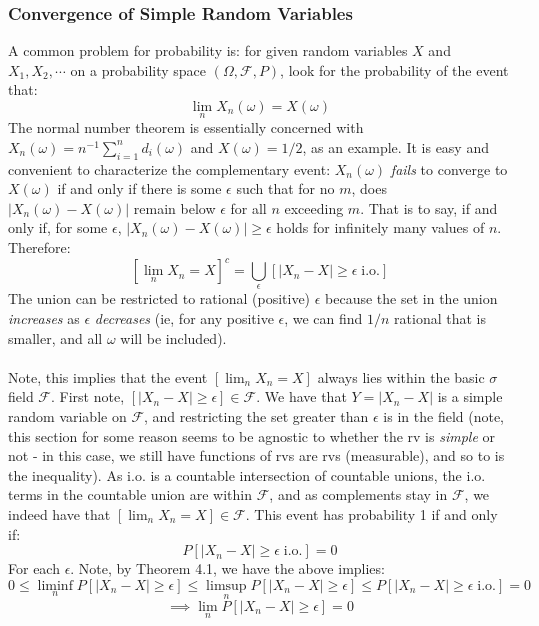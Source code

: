 \documentclass[12pt,a4paper]{article}
\newcommand{\1}[1]{\mathbbm{1}\left\{ #1 \right\}}
\newcommand{\fcal}{\mathcal{F}}
\newcommand{\io}{\text{i.o.}}
\begin{document}
\subsubsection{Convergence of Simple Random Variables}
A common problem for probability is: for given random variables $X$ and $X_1, X_2, \cdots$ on a probability space $(\Omega,\fcal,P)$, look for the probability of the event that:
$$
	\lim_n X_n(\omega) = X(\omega)
$$
The normal number theorem is essentially concerned with $X_n(\omega) = n^{-1}\sum_{i=1}^n d_i(\omega)$ and $X(\omega) = 1/2$, as an example. It is easy and convenient to characterize the complementary event: $X_n(\omega)$ \textit{fails} to converge to $X(\omega)$ if and only if there is some $\epsilon$ such that for no $m$, does $|X_n(\omega) - X(\omega)|$ remain below $\epsilon$ for all $n$ exceeding $m$. That is to say, if and only if, for some $\epsilon$, $|X_n(\omega) - X(\omega)| \geq \epsilon$ holds for infinitely many values of $n$. Therefore:
$$
	\left[\lim_n X_n = X\right]^c = \bigcup_\epsilon \left[|X_n - X| \geq \epsilon \;\io\right]
$$
The union can be restricted to rational (positive) $\epsilon$ because the set in the union \textit{increases} as $\epsilon$ \textit{decreases} (ie, for any positive $\epsilon$, we can find $1/n$ rational that is smaller, and all $\omega$ will be included).
\\\\
Note, this implies that the event $\left[\lim_n X_n = X\right]$ always lies within the basic $\sigma$ field $\fcal$. First note, $\left[|X_n - X| \geq \epsilon\right] \in \fcal$. We have that $Y = |X_n - X|$ is a simple random variable on $\fcal$, and restricting the set greater than $\epsilon$ is in the field (note, this section for some reason seems to be agnostic to whether the rv is \textit{simple} or not - in this case, we still have functions of rvs are rvs (measurable), and so to is the inequality). As $\io$ is a countable intersection of countable unions, the $\io$ terms in the countable union are within $\fcal$, and as complements stay in $\fcal$, we indeed have that $\left[\lim_n X_n = X\right] \in \fcal$. This event has probability 1 if and only if:
$$
	P\left[|X_n - X| \geq \epsilon \;\io\right] = 0
$$
For each $\epsilon$. Note, by Theorem 4.1, we have the above implies:
$$
	0 \leq \liminf_n P\left[|X_n - X| \geq \epsilon\right] \leq
	\limsup_n P\left[|X_n - X| \geq \epsilon\right] \leq
	P\left[|X_n - X| \geq \epsilon \;\io\right] = 0
$$
$$
	\implies
	\lim_n P\left[|X_n - X| \geq \epsilon\right] = 0
$$
\end{document}
